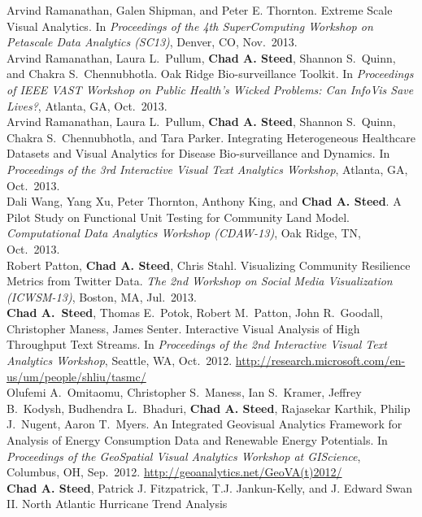 \documentclass[11pt, letterpaper]{article}
\newcommand{\years}[1]{\marginnote{\scriptsize #1}}
\begin{document}
\begin{sloppypar}
Arvind Ramanathan, Galen Shipman, and Peter E. Thornton. Extreme Scale Visual Analytics.
In \emph{Proceedings of the 4th SuperComputing Workshop on Petascale Data Analytics (SC13)},
Denver, CO, Nov.\ 2013.\\
\years{2013}Arvind Ramanathan, Laura L.\ Pullum, \textbf{Chad A. Steed},
Shannon S.\ Quinn, and Chakra S.\ Chennubhotla. Oak Ridge Bio-surveillance Toolkit.
In \emph{Proceedings of IEEE VAST Workshop on Public Health's Wicked Problems:
Can InfoVis Save Lives?}, Atlanta, GA, Oct.\ 2013.\\
\years{2013}Arvind Ramanathan, Laura L.\ Pullum, \textbf{Chad A. Steed},
Shannon S.\ Quinn, Chakra S.\ Chennubhotla, and Tara Parker.
Integrating Heterogeneous Healthcare Datasets and Visual Analytics for Disease
Bio-surveillance and Dynamics. In \emph{Proceedings of the 3rd Interactive
Visual Text Analytics Workshop}, Atlanta, GA, Oct.\ 2013.\\
\years{2013}Dali Wang, Yang Xu, Peter Thornton, Anthony King,
and \textbf{Chad A. Steed}. A Pilot Study on Functional Unit Testing for
Community Land Model. \emph{Computational Data Analytics Workshop (CDAW-13)},
Oak Ridge, TN, Oct.\ 2013.\\
\years{2013}Robert Patton, \textbf{Chad A. Steed}, Chris Stahl.
Visualizing Community Resilience Metrics from Twitter Data. \emph{The 2nd Workshop
on Social Media Visualization (ICWSM-13)}, Boston, MA, Jul.\ 2013.\\
\years{2012}\textbf{Chad A.\ Steed}, Thomas E.\ Potok, Robert M.\ Patton,
John R.\ Goodall, Christopher Maness, James Senter.  Interactive Visual Analysis
of High Throughput Text Streams. In \emph{Proceedings of the 2nd Interactive
Visual Text Analytics Workshop}, Seattle, WA, Oct.\ 2012.
\href{http://research.microsoft.com/en-us/um/people/shliu/tasmc/}
{http://research.microsoft.com/en-us/um/people/shliu/tasmc/}\\
\years{2012}Olufemi A.\ Omitaomu, Christopher S.\ Maness, Ian S.\ Kramer,
Jeffrey B.\ Kodysh, Budhendra L.\ Bhaduri, \textbf{Chad A. Steed},
Rajasekar Karthik, Philip J.\ Nugent, Aaron T.\ Myers. An Integrated Geovisual
Analytics Framework for Analysis of Energy Consumption Data and Renewable
Energy Potentials. In \emph{Proceedings of the GeoSpatial Visual Analytics Workshop at
GIScience}, Columbus, OH, Sep.\ 2012.
\href{http://geoanalytics.net/GeoVA(t)2012/}{http://geoanalytics.net/GeoVA(t)2012/}\\
\years{2009}\textbf{Chad A. Steed}, Patrick J. Fitzpatrick, T.J.
Jankun-Kelly, and J. Edward Swan II. North Atlantic Hurricane Trend Analysis

\end{sloppypar}
\end{document}
